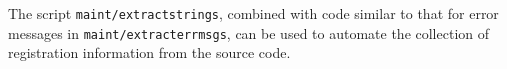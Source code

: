 \documentclass{report}
\begin{document}
The script
\texttt{maint/extractstrings}, combined with code similar to that for 
error messages in \texttt{maint/extracterrmsgs}, can be used to
automate the collection of registration information from the source code.









\end{document}
